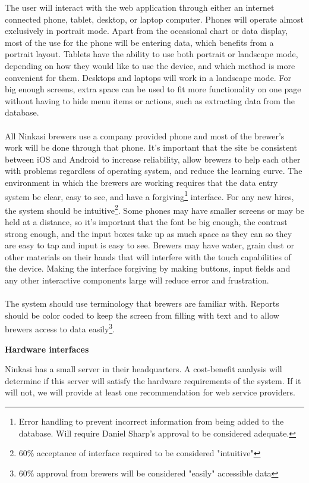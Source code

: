 			The user will interact with the web application through either an internet connected phone, tablet, desktop, or laptop computer.
			Phones will operate almost exclusively in portrait mode.
			Apart from the occasional chart or data display, most of the use for the phone will be entering data, which benefits from a portrait layout.
			Tablets have the ability to use both portrait or landscape mode, depending on how they would like to use the device, and which method is more convenient for them.
			Desktops and laptops will work in a landscape mode.
			For big enough screens, extra space can be used to fit more functionality on one page without having to hide menu items or actions, such as extracting data from the database.
			\\
			\\
			All Ninkasi brewers use a company provided phone and most of the brewer's work will be done through that phone.
			It's important that the site be consistent between iOS and Android to increase reliability, allow brewers to help each other with problems regardless of operating system, and reduce the learning curve.
			The environment in which the brewers are working requires that the data entry system be clear, easy to see, and have a forgiving\footnote{Error handling to prevent incorrect information from being added to the database. Will require Daniel Sharp's approval to be considered adequate.} interface.
			For any new hires, the system should be intuitive\footnote{60\% acceptance of interface required to be considered "intuitive"}.
			Some phones may have smaller screens or may be held at a distance, so it's important that the font be big enough, the contrast strong enough, and the input boxes take up as much space as they can so they are easy to tap and input is easy to see.
			Brewers may have water, grain dust or other materials on their hands that will interfere with the touch capabilities of the device.
			Making the interface forgiving by making buttons, input fields and any other interactive components large will reduce error and frustration.
			\\
			\\
			The system should use terminology that brewers are familiar with.
			Reports should be color coded to keep the screen from filling with text and to allow brewers access to data easily\footnote{60\% approval from brewers will be considered "easily" accessible data}.

		\textbf{Hardware interfaces}

			Ninkasi has a small server in their headquarters.
			A cost-benefit analysis will determine if this server will satisfy the hardware requirements of the system.
			If it will not, we will provide at least one recommendation for web service providers.

